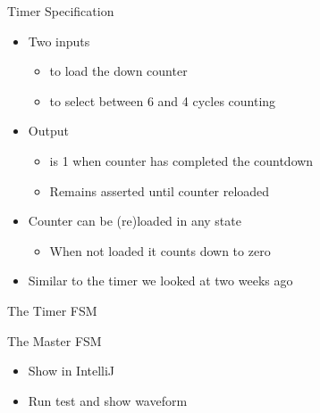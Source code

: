 \begin{frame}[fragile]{Timer Specification}
\begin{itemize}
\item Two inputs
\begin{itemize}
\item {} to load the down counter
\item {} to select between 6 and 4 cycles counting
\end{itemize}
\item Output
\begin{itemize}
\item {} is 1 when counter has completed the countdown
\item Remains asserted until counter reloaded
\end{itemize}
\item Counter can be (re)loaded in any state
\begin{itemize}
\item When not loaded it counts down to zero
\end{itemize}
\item Similar to the timer we looked at two weeks ago
\end{itemize}
\end{frame}

\begin{frame}[fragile]{The Timer FSM}
\end{frame}

\begin{frame}[fragile]{The Master FSM}
\begin{itemize}
\item Show in IntelliJ
\item Run test and show waveform
\end{itemize}
\end{frame}


%

